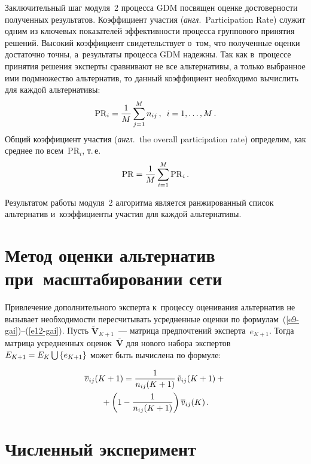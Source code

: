 \begin{multicols}{2}
  Заключительный шаг модуля~2 процесса GDM посвящен оценке 
достоверности полученных результатов. Коэффициент участия (\textit{англ}.\ 
Participation Rate) служит одним из ключевых показателей эффективности 
процесса группового принятия решений. Высокий коэффициент 
свидетельствует о~том, что полученные оценки достаточно точны, а~результаты 
процесса GDM надежны. Так как в~процессе принятия решения эксперты 
сравнивают не все альтернативы, а только выбранное ими подмножество 
альтернатив, то данный коэффициент необходимо вычислить для каждой 
альтернативы:
  \begin{equation}
 \mathrm{PR}_i=\displaystyle\frac{\displaystyle 1\mathstrut}{\displaystyle M\mathstrut}\sum\limits^M_{j=1} n_{ij}\,,\enskip i=1,\ldots , M\,.
  \label{e16-gai}
  \end{equation}
Общий коэффициент участия (\textit{англ}.\ the overall participation rate) определим, как 
среднее по всем~$\mathrm{PR}_i$, т.\,е.
\begin{equation*}
\mathrm{PR}=\displaystyle\frac{\displaystyle 1\mathstrut}{\displaystyle M\mathstrut}\sum\limits^M_{i=1} \mathrm{PR}_i\,.
\end{equation*}
  
  Результатом работы модуля~2 алгоритма является ранжированный список 
альтернатив и~коэффициенты участия для каждой альтернативы.

\section{Метод оценки альтернатив при~масштабировании сети}

  Привлечение дополнительного эксперта к~процессу оценивания альтернатив 
не вызывает необходимости пересчитывать усредненные оценки по 
формулам~(\ref{e9-gai})--(\ref{e12-gai}). Пусть $\tilde{\mathbf{V}}_{K+1}$~--- 
матрица предпочтений эксперта~$e_{K+1}$. Тогда матрица усредненных 
оценок~$\overline{\mathbf{V}}$ для нового набора экспертов $E_{K+1}\hm= 
E_K\bigcup \left\{ e_{K+1}\right\}$ может быть вычислена по формуле:
\vspace*{-2pt}

\noindent
  \begin{multline*}
  \overline{v}_{ij}(K+1)=\displaystyle\frac{\displaystyle 1\mathstrut}{\displaystyle n_{ij}(K+1)\mathstrut}\,\tilde{v}_{ij} (K+1)+{}\\
  {}+\left( 1- \displaystyle\frac{\displaystyle 1\mathstrut}{\displaystyle n_{ij}(K+1)\mathstrut}\right) \overline{v}_{ij}(K)\,.
  \end{multline*}
  
\vspace*{-16pt}

\section{Численный эксперимент}


\end{multicols}

